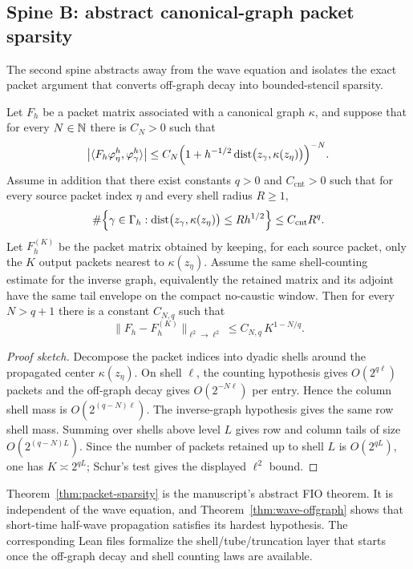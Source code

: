 \subsection{Spine B: abstract canonical-graph packet sparsity}

The second spine abstracts away from the wave equation and isolates the exact packet argument that converts off-graph decay into bounded-stencil sparsity.

\begin{theorem}
\label{thm:packet-sparsity}
Let $F_h$ be a packet matrix associated with a canonical graph $\kappa$, and suppose that for every $N\in\mathbb N$ there is $C_N>0$ such that
\[
\bigl|\langle F_h\varphi_\eta^h,\varphi_\gamma^h\rangle\bigr|
\le
C_N \Bigl(1+h^{-1/2}\,\mathrm{dist}\bigl(z_\gamma,\kappa(z_\eta)\bigr)\Bigr)^{-N}.
\]
Assume in addition that there exist constants $q>0$ and $C_{\mathrm{cnt}}>0$ such that for every source packet index $\eta$ and every shell radius $R\ge 1$,
\begin{equation}
\label{eq:packet-count}
\#\Bigl\{\gamma\in\Gamma_h :
\mathrm{dist}\bigl(z_\gamma,\kappa(z_\eta)\bigr)\le R h^{1/2}\Bigr\}
\le
C_{\mathrm{cnt}} R^q.
\end{equation}
Let $F_h^{(K)}$ be the packet matrix obtained by keeping, for each source packet, only the $K$ output packets nearest to $\kappa(z_\eta)$.  Assume the same shell-counting estimate for the inverse graph, equivalently the retained matrix and its adjoint have the same tail envelope on the compact no-caustic window. Then for every $N>q+1$ there is a constant $C_{N,q}$ such that
\[
\|F_h-F_h^{(K)}\|_{\ell^2\to\ell^2}
\le
C_{N,q}\, K^{1-N/q}.
\]
\end{theorem}

\begin{proof}[Proof sketch]
Decompose the packet indices into dyadic shells around the propagated center $\kappa(z_\eta)$. On shell $\ell$, the counting hypothesis gives $O(2^{q\ell})$ packets and the off-graph decay gives $O(2^{-N\ell})$ per entry. Hence the column shell mass is $O(2^{(q-N)\ell})$. The inverse-graph hypothesis gives the same row shell mass. Summing over shells above level $L$ gives row and column tails of size $O(2^{(q-N)L})$. Since the number of packets retained up to shell $L$ is $O(2^{qL})$, one has $K\asymp 2^{qL}$; Schur's test gives the displayed $\ell^2$ bound.
\end{proof}

Theorem~\ref{thm:packet-sparsity} is the manuscript's abstract FIO theorem. It is independent of the wave equation, and Theorem~\ref{thm:wave-offgraph} shows that short-time half-wave propagation satisfies its hardest hypothesis. The corresponding Lean files formalize the shell/tube/truncation layer that starts once the off-graph decay and shell counting laws are available.

